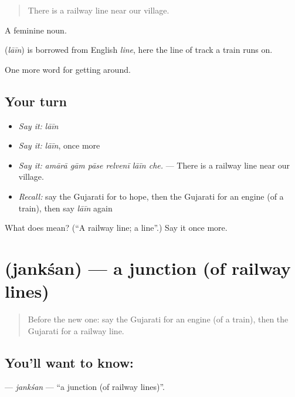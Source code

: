 \begin{quote}
There is a railway line near our village.
\end{quote}

A feminine noun.

\begin{cousinweb}
\textbf{} (\emph{lāīn}) is borrowed from English \emph{line}, here the line of track a train runs on.
\end{cousinweb}

\begin{grammarlens}[title={What you've built}]
One more word for getting around.
\end{grammarlens}

\subsection*{Your turn}
\begin{itemize}
\raggedright
  \item \emph{Say it:} \emph{lāīn}
  \item \emph{Say it:} \emph{lāīn}, once more
  \item \emph{Say it:} \emph{amārā gām pāse relvenī lāīn che.} — There is a railway line near our village.
  \item \emph{Recall:} say the Gujarati for to hope, then the Gujarati for an engine (of a train), then say \emph{lāīn} again
\end{itemize}

\begin{tcolorbox}[breakable,colback=teal!4,colframe=teal!35!black,title={Before you move on}]
What does  mean? (\textquotedblleft{}A railway line; a line\textquotedblright{}.) Say it once more.
\end{tcolorbox}
\section[\texorpdfstring{\gu{જંકશન} (jankśan)}{જંકશન (jankśan)}]{ (jankśan) — a junction (of railway lines)}

\label{lesson:GU-C393-janksan}



\begin{quote}
Before the new one: say the Gujarati for an engine (of a train), then the Gujarati for a railway line.
\end{quote}

\subsection*{You'll want to know: }
\textbf{} — \emph{jankśan} — \textquotedblleft{}a junction (of railway lines)\textquotedblright{}.

